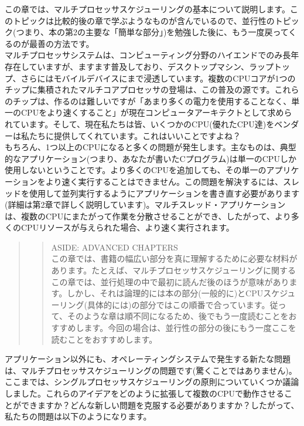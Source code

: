 この章では、マルチプロセッサスケジューリングの基本について説明します。このトピックは比較的後の章で学ぶようなものが含んでいるので、並行性のトピック(つまり、本の第2の主要な「簡単な部分」)を勉強した後に、もう一度戻ってくるのが最善の方法です。\\
マルチプロセッサシステムは、コンピューティング分野のハイエンドでのみ長年存在していますが、ますます普及しており、デスクトップマシン、ラップトップ、さらにはモバイルデバイスにまで浸透しています。複数のCPUコアが1つのチップに集積されたマルチコアプロセッサの登場は、この普及の源です。これらのチップは、作るのは難しいですが「あまり多くの電力を使用することなく、単一のCPUをより速くすること」が現在コンピュータアーキテクトとして求められています。そして、現在私たちは皆、いくつかのCPU(優れたCPU達)をベンダーは私たちに提供してくれています。これはいいことですよね？\\
もちろん、1つ以上のCPUになると多くの問題が発生します。主なものは、典型的なアプリケーション(つまり、あなたが書いたCプログラム)は単一のCPUしか使用しないということです。より多くのCPUを追加しても、その単一のアプリケーションをより速く実行することはできません。この問題を解決するには、スレッドを使用して並列実行するようにアプリケーションを書き直す必要があります(詳細は第2章で詳しく説明しています)。マルチスレッド・アプリケーションは、複数のCPUにまたがって作業を分散させることができ、したがって、より多くのCPUリソースが与えられた場合、より速く実行されます。

\begin{quote}
\begin{quote}
ASIDE: ADVANCED CHAPTERS\\
この章では、書籍の幅広い部分を真に理解するために必要な材料があります。たとえば、マルチプロセッサスケジューリングに関するこの章では、並行処理の中で最初に読んだ後のほうが意味があります。しかし、それは論理的には本の部分(一般的に)とCPUスケジューリング(具体的には)の部分ではこの順番で合っています。従って、そのような章は順不同になるため、後でもう一度読むことをおすすめします。今回の場合は、並行性の部分の後にもう一度ここを読むことをおすすめします。
\end{quote}
\end{quote}

アプリケーション以外にも、オペレーティングシステムで発生する新たな問題は、マルチプロセッサスケジューリングの問題です(驚くことではありません)。ここまでは、シングルプロセッサスケジューリングの原則についていくつか議論しました。これらのアイデアをどのように拡張して複数のCPUで動作させることができますか？どんな新しい問題を克服する必要がありますか？したがって、私たちの問題は以下のようになります。

